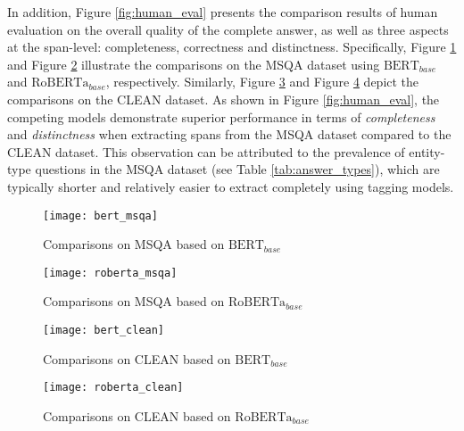 \documentclass[a4paper]{cas-sc}
\newcommand{\1}[1]{\mathds{1}\left[#1\right]}
\newcommand{\figref}[1]{Figure \ref{#1}}
\newcommand{\tableref}[1]{Table \ref{#1}}
\begin{document}
In addition, \figref{fig:human_eval} presents the comparison results of human evaluation on the overall quality of the complete answer, as well as three aspects at the span-level: completeness, correctness and distinctness. 
Specifically, \figref{fig:bert_msqa}  and \figref{fig:roberta_msqa} illustrate the comparisons on the MSQA dataset using $\text{BERT}_{base}$ and $\text{RoBERTa}_{base}$, respectively.
Similarly, \figref{fig:bert_clean} and \figref{fig:roberta_clean} depict the comparisons on the CLEAN dataset. As shown in \figref{fig:human_eval}, the competing models demonstrate superior performance in terms of \emph{completeness} and \emph{distinctness} when extracting spans from the MSQA dataset compared to the CLEAN dataset. This observation can be attributed to the prevalence of entity-type questions in the MSQA dataset (see \tableref{tab:answer_types}), which are typically shorter and relatively easier to extract completely using tagging models. 

\begin{figure*}[!ht]
	\centering
	\begin{subfigure}{.49\textwidth}
		\centering
		\texttt{[image: bert\_msqa]}
		\caption{Comparisons on MSQA based on $\text{BERT}_{base}$}
		\label{fig:bert_msqa}
	\end{subfigure}%
	\begin{subfigure}{.49\textwidth}
		\centering
		\texttt{[image: roberta\_msqa]}
		\caption{Comparisons on MSQA based on $\text{RoBERTa}_{base}$}
		\label{fig:roberta_msqa}
	\end{subfigure}%
	
	\begin{subfigure}{.49\textwidth}
		\centering
		\texttt{[image: bert\_clean]}
		\caption{Comparisons on CLEAN based on $\text{BERT}_{base}$}
		\label{fig:bert_clean}
	\end{subfigure}%
	\begin{subfigure}{.49\textwidth}
		\centering
		\texttt{[image: roberta\_clean]}
		\caption{Comparisons on CLEAN based on $\text{RoBERTa}_{base}$}
		\label{fig:roberta_clean}
	\end{subfigure}%
	
	\caption{Human evaluations on MSQA and CLEAN datasets. }
	\label{fig:human_eval}
\end{figure*}
\end{document}
